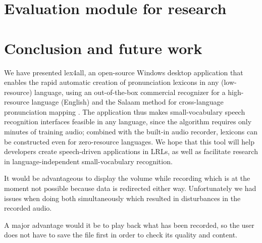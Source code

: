 \documentclass[11pt]{article}
\begin{document}
\section{Evaluation module for research}
\label{sec:evaluation}

\section{Conclusion and future work}
\label{sec:future}

We have presented lex4all, an open-source Windows desktop application that enables the rapid automatic creation of pronunciation lexicons in any (low-resource) language, using an out-of-the-box commercial recognizer \cite{mspsdk} for a high-resource language (English) and the Salaam method for cross-language pronunciation mapping \cite{Qiao10,Chan12}. The application thus makes small-vocabulary speech recognition interfaces feasible in any language, since the algorithm requires only minutes of training audio; combined with the built-in audio recorder, lexicons can be constructed even for zero-resource languages. We hope that this tool will help developers create speech-driven applications in LRLs, as well as facilitate research in language-independent small-vocabulary recognition.

It would be advantageous to display the volume while recording which is at the moment not possible because data is redirected either way. Unfortunately we had issues when doing both simultaneously which resulted in disturbances in the recorded audio.

A major advantage would it be to play back what has been recorded, so the user does not have to save the file first in order to check its quality and content.

%

%
%


\end{document}

